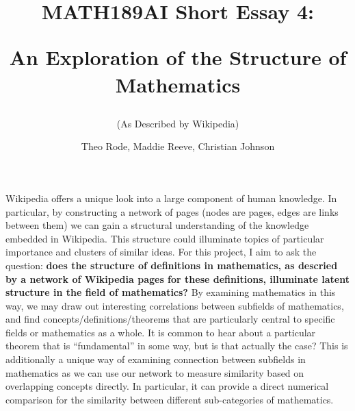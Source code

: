 \documentclass[10pt]{paper}
\begin{document}
\title{MATH189AI Short Essay 4: 

An Exploration of the Structure of Mathematics}
\subtitle{(As Described by Wikipedia)}
\author{Theo Rode, Maddie Reeve, Christian Johnson}



\maketitle

Wikipedia offers a unique look into a large component of human knowledge. In particular, by constructing a network of pages (nodes are pages, edges are links between them) we can gain a structural understanding of the knowledge embedded in Wikipedia. 
This structure could illuminate topics of particular importance and clusters of similar ideas. For this project, I aim to ask the question: \textbf{does the structure of definitions in mathematics, as descried by a network of Wikipedia pages for these definitions, illuminate latent structure in the field of mathematics?}
By examining mathematics in this way, we may draw out interesting correlations between subfields of mathematics, and find concepts/definitions/theorems that are particularly central to specific fields or mathematics as a whole. 
It is common to hear about a particular theorem that is ``fundamental'' in some way, but is that actually the case? This is additionally a unique way of examining connection between subfields in mathematics as we can use our network to measure similarity based on overlapping concepts directly. In particular, it can provide a direct numerical comparison for the similarity between different sub-categories of mathematics. 
\end{document}
